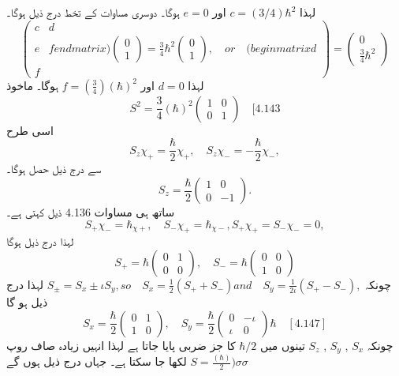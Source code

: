 \documentclass{book}
\begin{document}
لہذا $ c=(3/4)\hbar^2 $ اور $ e=0 $ ہوگا۔ دوسری مساوات کے تخط درج ذیل ہوگا۔
$$ (\begin{matrix} c & d \\ e & f end{matrix}) (\begin{matrix} 0 \\ 1 \end{matrix}) = \frac{3}{4}\hbar^2
 (\begin{matrix} 0 \\ 1 \end{matrix}), \quad or \quad (begin{matrix} d \\ f \end{matrix})= (\begin{matrix}0 \\ \frac{3}{4}\hbar^2 \end{matrix}) $$ 
 لہذا $ d=0 $ اور $ f=(\frac{3}{4})(\hbar)^2 $ ہوگا۔ ماخوذ
 $$ S^2= \frac{3}{4}(\hbar)^2 \left(\begin{matrix} 1&0 \\ 0&1 \end{matrix}\right) \quad [4.143$$ 
اسی طرح 
$$ S_{z}\chi_{+}=\frac{\hbar}{2}\chi_{+}, \quad S_{z} \chi_{-}=-\frac{\hbar}{2}\chi_{-}, $$
سے درج ذیل حصل ہوگا۔
$$ S_{z}= \frac{\hbar}{2}\left(\begin{matrix} 1&0 \\ 0&-1 \end{matrix}\right). $$
ساتھ ہی مساوات 4.136 ذیل کہتی ہے۔
$$ S_{+} \chi_{-}=\hbar_{\chi+}, \quad S_{-}\chi_{+}=\hbar_{\chi-} , S_{+} \chi_{+}= S_{-} \chi_{-}=0, $$
لہذا درج ذیل ہوگا
$$ S_{+}=\hbar\left(\begin{matrix} 0&1 \\ 0&0 \end{matrix}\right), \quad S_{-}=\hbar\left(\begin{matrix}0&0 \\ 1&0 \end{matrix}\right) $$
چونکہ 
$ S_{\pm}=S_{x} {\pm} \iota S_{y}, so \quad S_{x}=\frac{1}{2}(S_{+}+S_{-}) and \quad S_{y}= \frac{1}{2\iota} (S_{+}-S_{-}), $ 
لہذا درج ذیل ہو گا
$$ S_{x}=\frac{\hbar}{2}\left(\begin{matrix} 0&1 \\1&0 \end{matrix}\right), \quad S_{y}=\frac{\hbar}{2}\left(\begin{matrix} 0&-\iota \\ \iota& 0 \end{matrix}\right)\hbar\quad [4.147] $$
چونکہ $ S_{x} $ , $ S_{y} $ , $ S_z $ تینوں میں $  \hbar /2 $ کا جز ضربی پایا جاتا ہے لہذا انہیں زیادہ صاف روپ $ S=\frac{(\hbar)}{2} )\sigma \sigma $ لکھا جا سکتا ہے۔ جہاں درج ذیل ہوں گے
\end{document}
